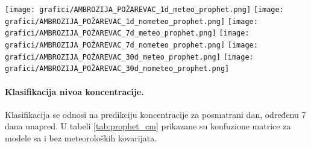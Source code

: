 \documentclass[12pt]{article}
\begin{document}
\begin{center}
    \texttt{[image: grafici/AMBROZIJA\_POŽAREVAC\_1d\_meteo\_prophet.png]}
    \vspace{0.3cm}
    \texttt{[image: grafici/AMBROZIJA\_POŽAREVAC\_1d\_nometeo\_prophet.png]}
    \vspace{0.3cm}
    \texttt{[image: grafici/AMBROZIJA\_POŽAREVAC\_7d\_meteo\_prophet.png]}
    \vspace{0.3cm}
    \texttt{[image: grafici/AMBROZIJA\_POŽAREVAC\_7d\_nometeo\_prophet.png]}
    \vspace{0.3cm}
    \texttt{[image: grafici/AMBROZIJA\_POŽAREVAC\_30d\_meteo\_prophet.png]}
    \vspace{0.3cm}
    \texttt{[image: grafici/AMBROZIJA\_POŽAREVAC\_30d\_nometeo\_prophet.png]}
    \label{fig:prophet_forecast_6x1}
\end{center}


\paragraph{\textbf{Klasifikacija nivoa koncentracije.}}  
Klasifikacija se odnosi na predikciju koncentracije za posmatrani dan, određenu 7 dana unapred.  
U tabeli \ref{tab:prophet_cm} prikazane su konfuzione matrice za modele sa i bez meteoroloških kovarijata.
\end{document}

